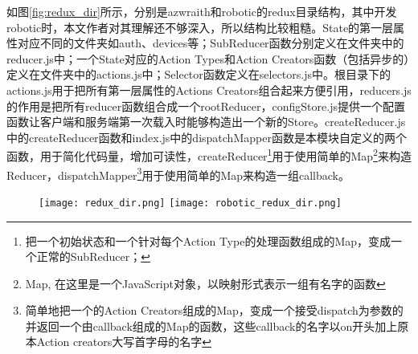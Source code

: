 如图\ref{fig:redux_dir}所示，分别是azwraith和robotic的redux目录结构，其中开发robotic时，本文作者对其理解还不够深入，所以结构比较粗糙。State的第一层属性对应不同的文件夹如auth、devices等；SubReducer函数分别定义在文件夹中的reducer.js中；一个State对应的Action Types和Action Creators函数（包括异步的）定义在文件夹中的actions.js中；Selector函数定义在selectors.js中。根目录下的actions.js用于把所有第一层属性的Actions Creators组合起来方便引用，reducers.js的作用是把所有reducer函数组合成一个rootReducer，configStore.js提供一个配置函数让客户端和服务端第一次载入时能够构造出一个新的Store。createReducer.js中的createReducer函数和index.js中的dispatchMapper函数是本模块自定义的两个函数，用于简化代码量，增加可读性，createReducer\footnote{把一个初始状态和一个针对每个Action Type的处理函数组成的Map，变成一个正常的SubReducer；}用于使用简单的Map\footnote{Map, 在这里是一个JavaScript对象，以映射形式表示一组有名字的函数}来构造Reducer，dispatchMapper\footnote{简单地把一个的Action Creators组成的Map，变成一个接受dispatch为参数的并返回一个由callback组成的Map的函数，这些callback的名字以on开头加上原本Action creators大写首字母的名字}用于使用简单的Map来构造一组callback。
\begin{figure}[!htp]
 \centering
 \texttt{[image: redux\_dir.png]}
  \hspace{1cm}
 \texttt{[image: robotic\_redux\_dir.png]}
\end{figure}

